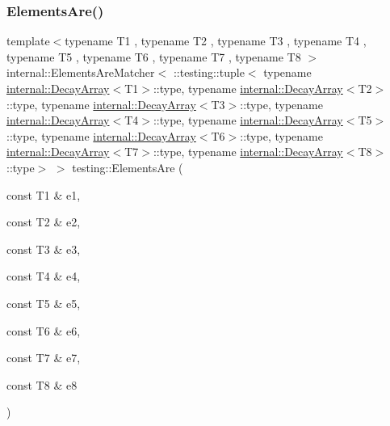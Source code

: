 \subsubsection{\texorpdfstring{ElementsAre()}{ElementsAre()}\hspace{0.1cm}{\footnotesize\ttfamily [9/11]}}
{\footnotesize\ttfamily template$<$typename T1 , typename T2 , typename T3 , typename T4 , typename T5 , typename T6 , typename T7 , typename T8 $>$ \\
internal\+::\+Elements\+Are\+Matcher$<$ \+::testing\+::tuple$<$ typename \mbox{\hyperlink{structtesting_1_1internal_1_1DecayArray}{internal\+::\+Decay\+Array}}$<$T1$>$\+::type, typename \mbox{\hyperlink{structtesting_1_1internal_1_1DecayArray}{internal\+::\+Decay\+Array}}$<$T2$>$\+::type, typename \mbox{\hyperlink{structtesting_1_1internal_1_1DecayArray}{internal\+::\+Decay\+Array}}$<$T3$>$\+::type, typename \mbox{\hyperlink{structtesting_1_1internal_1_1DecayArray}{internal\+::\+Decay\+Array}}$<$T4$>$\+::type, typename \mbox{\hyperlink{structtesting_1_1internal_1_1DecayArray}{internal\+::\+Decay\+Array}}$<$T5$>$\+::type, typename \mbox{\hyperlink{structtesting_1_1internal_1_1DecayArray}{internal\+::\+Decay\+Array}}$<$T6$>$\+::type, typename \mbox{\hyperlink{structtesting_1_1internal_1_1DecayArray}{internal\+::\+Decay\+Array}}$<$T7$>$\+::type, typename \mbox{\hyperlink{structtesting_1_1internal_1_1DecayArray}{internal\+::\+Decay\+Array}}$<$T8$>$\+::type$>$ $>$ testing\+::\+Elements\+Are (\begin{DoxyParamCaption}\item[{const T1 \&}]{e1,  }\item[{const T2 \&}]{e2,  }\item[{const T3 \&}]{e3,  }\item[{const T4 \&}]{e4,  }\item[{const T5 \&}]{e5,  }\item[{const T6 \&}]{e6,  }\item[{const T7 \&}]{e7,  }\item[{const T8 \&}]{e8 }\end{DoxyParamCaption})\hspace{0.3cm}{\ttfamily [inline]}}

\mbox{\label{namespacetesting_aa39ad709c933dbbbe3cbaececa8b4577}} 

